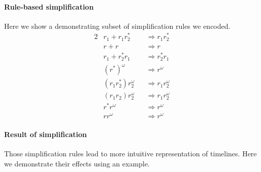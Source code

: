 \documentclass[preprint,12pt]{elsarticle}
\theoremstyle{definition}
\theoremstyle{remark}
\begin{document}
\paragraph*{Rule-based simplification}
Here we show a demonstrating subset of simplification rules we encoded.
\begin{alignat*}{2}
        & r_1 + r_1r_2^* && \Longrightarrow r_1r_2^* \\
        & r + r && \Longrightarrow r \\
        & r_1 + r_2^*r_1 && \Longrightarrow r_2^*r_1 \\
        & (r^*)^{\omega} && \Longrightarrow r^{\omega} \\
        & (r_1r_2^*)r_2^{\omega} && \Longrightarrow r_1r_2^{\omega} \\
        & (r_1r_2)r_2^{\omega} && \Longrightarrow r_1r_2^{\omega} \\
        & r^*r^{\omega} && \Longrightarrow r^{\omega} \\
        & rr^{\omega} && \Longrightarrow r^{\omega}
\end{alignat*}

\paragraph*{Result of simplification}
Those simplification rules lead to more intuitive representation of timelines. Here we demonstrate their effects using an example.
\end{document}
